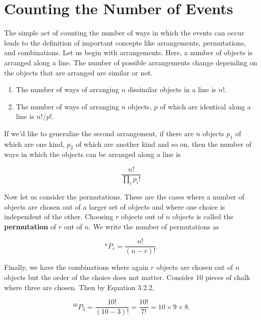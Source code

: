     \section{Counting the Number of Events}
        The simple act of counting the number of ways in which the events can occur leads to the definition of important concepts like arrangements, permutations, and combinations. Let us begin with arrangements. Here, a number of objects is arranged along a line. The number of possible arrangements change depending on the objects that are arranged are similar or not.\\
        \begin{enumerate}
            \item The number of ways of arranging $n$ dissimilar objects in a line is $n!$.
            \item The number of ways of arranging $n$ objects, $p$ of which are identical along a line is $n!/p!$.
        \end{enumerate}
        If we'd like to generalize the second arrangement, if there are $n$ objects $p_1$ of which are one kind, $p_2$ of which are another kind and so on, then the number of ways in which the objects can be arranged along a line is
        
        \begin{equation}
            \frac{n!}{\prod_ip_i!}
        \end{equation}
        
        Now let us consider the permutations. These are the cases where a number of objects are chosen out of a larger set of objects and where one choice is independent of the other. Choosing $r$ objects out of $n$ objects is called the \textbf{permutation} of $r$ out of $n$. We write the number of permutations as
        
        \begin{equation}
            ^nP_r = \frac{n!}{(n-r)!}.
        \end{equation}
        
        Finally, we have the combinations where again $r$ objects are chosen out of $n$ objects but the order of the choice does not matter. Consider 10 pieces of chalk where three are chosen. Then by Equation 3.2.2,
        
        \begin{equation}
            ^{10}P_3 = \frac{10!}{(10-3)!} = \frac{10!}{7!} = 10\times9\times8.
        \end{equation}
        
